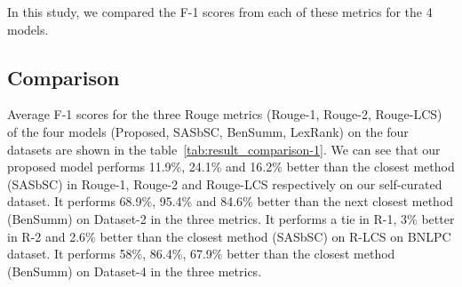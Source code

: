 In this study, we compared the F-1 scores from each of these metrics for the 4 models.

\subsection{Comparison}\label{subsec:comparison}
Average F-1 scores for the three Rouge metrics (Rouge-1, Rouge-2, Rouge-LCS) of the four models (Proposed,
SASbSC, BenSumm, LexRank) on the four datasets are shown in the table~\ref{tab:result_comparison-1}.
We can see that our proposed model performs 11.9\%, 24.1\% and 16.2\% better
than the closest method (SASbSC) in Rouge-1, Rouge-2 and Rouge-LCS respectively
on our self-curated dataset.
It performs 68.9\%, 95.4\% and 84.6\% better than the next closest method (BenSumm) on
Dataset-2 in the three metrics.
It performs a tie in R-1, 3\% better in R-2 and 2.6\% better than the closest method (SASbSC) on R-LCS on BNLPC dataset.
It performs 58\%, 86.4\%, 67.9\% better than the closest method (BenSumm) on Dataset-4 in the three metrics.\\

